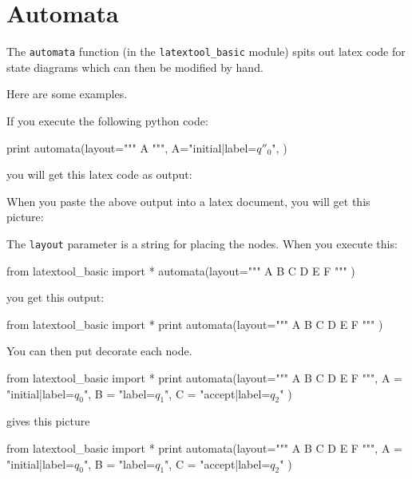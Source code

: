 \section{Automata}

The \verb!automata! function (in the \verb!latextool_basic! module)
spits out latex code for
state diagrams which can then be modified by hand.

Here are some examples.

If you execute the following python code:
\begin{console}
print automata(layout="""
    A
    """,
    A="initial|label=$q''_0$",
    )
\end{console}
you will get this latex code as output:
\begin{console}
\begin{center}
\end{center}
\end{console}
When you paste the above output into a 
latex document, you will get this picture:
\begin{center}
\end{center}




The \verb!layout! parameter is a string for placing the nodes.
When you execute this:
\begin{console}
from latextool_basic import *
automata(layout="""
A B   C
D
E   F
"""
)
\end{console}
you get this output:
\begin{python}
from latextool_basic import *
print automata(layout="""
A B   C
D
E   F
"""
)
\end{python}
You can then put decorate each node.
\begin{console}
from latextool_basic import *
print automata(layout="""
A B   C
D
E   F
""",
A = "initial|label=$q_0$",
B = "label=$q_1$",
C = "accept|label=$q_2$"
)
\end{console}
gives this picture
\begin{python}
from latextool_basic import *
print automata(layout="""
A B   C
D
E   F
""",
A = "initial|label=$q_0$",
B = "label=$q_1$",
C = "accept|label=$q_2$"
)
\end{python}







